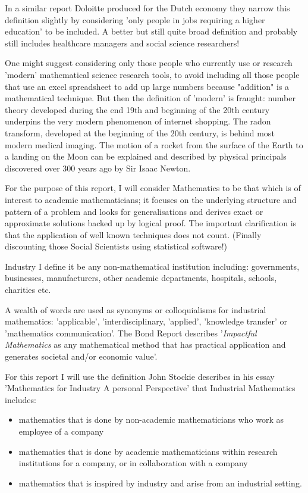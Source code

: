 \documentclass[11pt]{article} %
\begin{document}
	
	In a similar report Doloitte produced for the Dutch economy \cite{deloitteNL} they narrow this definition slightly by considering 'only people in jobs requiring a higher education' to be included.  A better but still quite broad definition and probably still includes healthcare managers and social science researchers!
	
	
	One might suggest considering only those people who currently use or research 'modern' mathematical science research tools, to avoid including all those people that use an excel spreadsheet to add up large numbers because "addition" is a mathematical technique. But then the definition of 'modern' is fraught: number theory developed during the end 19th and beginning of the 20th century underpins the very modern phenomenon of internet shopping. The radon transform, developed at the beginning of the 20th century, is behind most modern medical imaging. The motion of a rocket from the surface of the Earth to a landing on the Moon can be explained and described by physical principals discovered over 300 years ago by Sir Isaac Newton.
	
	
	For the purpose of this report, I  will consider Mathematics to be that which is of interest to academic mathematicians; it focuses  on the underlying structure and pattern of a problem and  looks for generalisations and derives exact or approximate solutions backed up by logical proof. The important clarification is that the application of well known techniques does not count. (Finally discounting those Social Scientists using statistical software!)
	
	
 Industry  I define it be any non-mathematical institution including: governments, businesses, manufacturers, other academic departments, hospitals, schools, charities etc. 


		A wealth of words are used as synonyms or colloquialisms for industrial mathematics: 'applicable', 'interdisciplinary, 'applied', 'knowledge transfer' or 'mathematics communication'. The Bond Report \cite{Bond} describes '\textit{Impactful Mathematics} as any mathematical method that has practical application and generates societal and/or economic value'. 
		
		For this report I will use the definition John Stockie describes in his essay 'Mathematics for Industry A personal Perspective' \cite{Stockie2015} that Industrial Mathematics includes: 
		
	\begin{itemize}
	\item mathematics that is done by non-academic mathematicians who work as employee of a company
	\item mathematics that is done by academic mathematicians within research institutions for a company, or in collaboration with a company
	\item mathematics that is inspired by industry and arise from an industrial setting. 
	\end{itemize}
	
\end{document}
